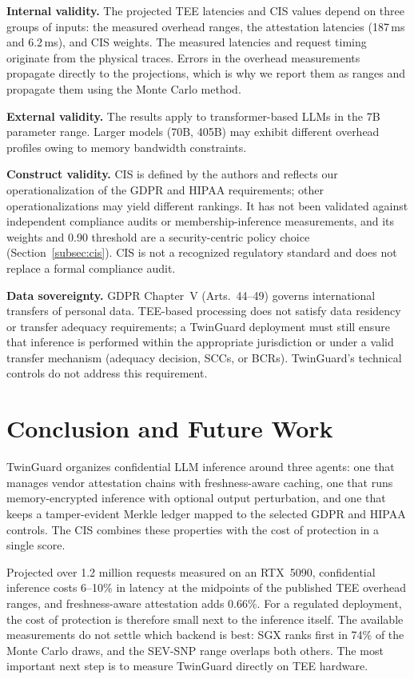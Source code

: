 \documentclass{ieeeaccess}
\begin{document}
\textbf{Internal validity.} The projected TEE latencies and CIS values depend
on three groups of inputs: the measured overhead ranges, the attestation
latencies (187\,ms and 6.2\,ms), and CIS weights. The measured latencies and request timing originate from the physical traces. Errors
in the overhead measurements propagate directly to the projections, which is
why we report them as ranges and propagate them using the Monte Carlo method.

\textbf{External validity.} The results apply to transformer-based LLMs in the
7B parameter range. Larger models (70B, 405B) may exhibit different overhead profiles owing to memory bandwidth constraints.

\textbf{Construct validity.} CIS is defined by the authors and reflects our
operationalization of the GDPR and HIPAA requirements; other
operationalizations may yield different rankings. It has not been validated
against independent compliance audits or membership-inference measurements,
and its weights and 0.90 threshold are a security-centric policy choice
(Section~\ref{subsec:cis}). CIS is not a recognized regulatory standard and
does not replace a formal compliance audit.

\textbf{Data sovereignty.} GDPR Chapter~V (Arts.\ 44--49) governs
international transfers of personal data. TEE-based processing does not satisfy data residency or transfer adequacy requirements; a
TwinGuard deployment must still ensure that inference is performed within
the appropriate jurisdiction or under a valid transfer mechanism
(adequacy decision, SCCs, or BCRs). TwinGuard's technical controls do not
address this requirement.

\section{Conclusion and Future Work}
\label{sec:conc}

TwinGuard organizes confidential LLM inference around three agents: one that
manages vendor attestation chains with freshness-aware caching, one that runs
memory-encrypted inference with optional output perturbation, and one that
keeps a tamper-evident Merkle ledger mapped to the selected GDPR and HIPAA controls. The CIS combines these properties with the cost of protection in a
single score.

Projected over 1.2 million requests measured on an RTX~5090, confidential
inference costs 6--10\% in latency at the midpoints of the published TEE
overhead ranges, and freshness-aware attestation adds 0.66\%. For a
regulated deployment, the cost of protection is therefore small next to the
inference itself. The available measurements do not settle which backend is
best: SGX ranks first in 74\% of the Monte Carlo draws, and the SEV-SNP range
overlaps both others. The most important next step is to measure TwinGuard
directly on TEE hardware.
\end{document}
